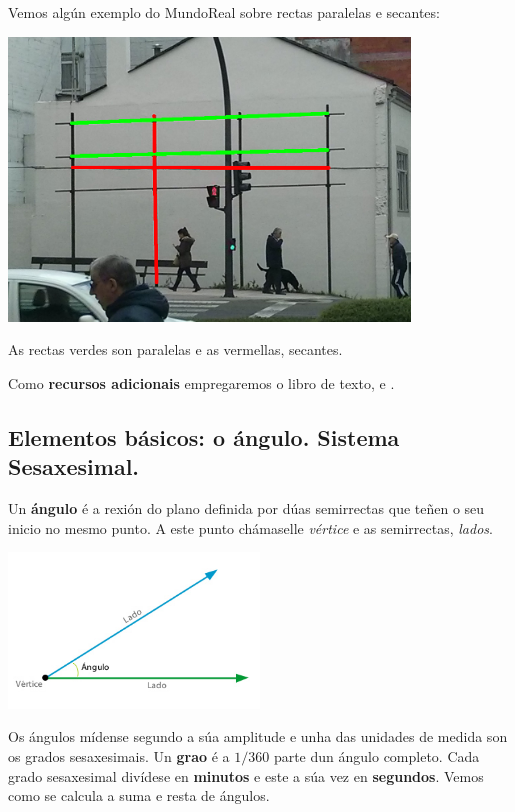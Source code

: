 Vemos algún exemplo do MundoReal sobre rectas paralelas e secantes:

\begin{center}
    \includegraphics[width=0.8\textwidth]{img/ejemplorectas.jpg}
\end{center}

As rectas verdes son paralelas e as vermellas, secantes.

Como \textbf{recursos adicionais} empregaremos o libro de texto, \cite{yt:puntorecta1} e \cite{yt:semirecta}.


\subsection{Elementos básicos: o ángulo. Sistema Sesaxesimal.}
Un \textbf{ángulo} é a rexión do plano definida por dúas semirrectas que teñen o seu inicio no mesmo punto. A este punto chámaselle \emph{vértice} e as semirrectas, \emph{lados}.

\begin{center}
    \includegraphics[width=0.5\textwidth]{img/angulo.jpg}
\end{center}

Os ángulos mídense segundo a súa amplitude e unha das unidades de medida son os grados sesaxesimais. Un \textbf{grao} é a $1/360$ parte dun ángulo completo. Cada grado sesaxesimal divídese en \textbf{minutos} e este a súa vez en \textbf{segundos}. Vemos como se calcula a suma e resta de ángulos.

